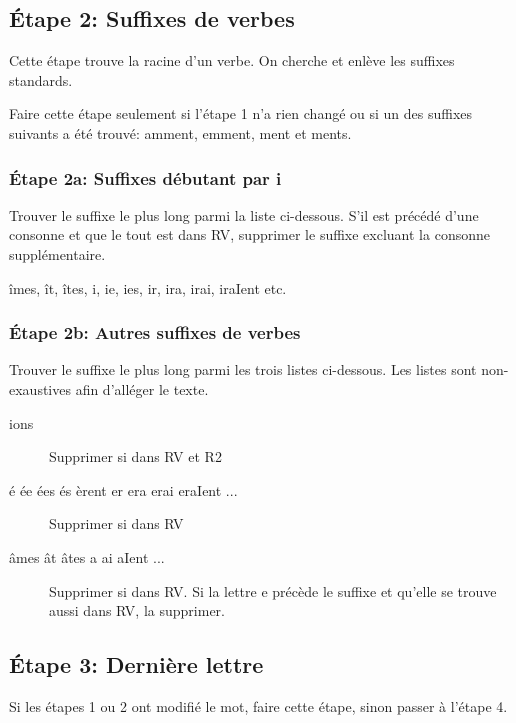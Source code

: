 \subsection*{Étape 2: Suffixes de verbes}

Cette étape trouve la racine d'un verbe.
On cherche et enlève les suffixes standards.

Faire cette étape seulement si l'étape 1 n'a rien changé ou si un des suffixes suivants a été trouvé: amment, emment, ment et ments.

\subsubsection*{Étape 2a: Suffixes débutant par i}

Trouver le suffixe le plus long parmi la liste ci-dessous.
S'il est précédé d'une consonne et que le tout est dans RV, supprimer le suffixe excluant la consonne supplémentaire.

îmes, ît, îtes, i, ie, ies, ir, ira, irai, iraIent etc.

\subsubsection*{Étape 2b: Autres suffixes de verbes}

Trouver le suffixe le plus long parmi les trois listes ci-dessous.
Les listes sont non-exaustives afin d'alléger le texte.

\begin{description}
  \item[ions]
  
  Supprimer si dans RV et R2
  
  \item[é ée ées és èrent er era erai eraIent ...]
  
  Supprimer si dans RV
  
  \item[âmes ât âtes a ai aIent ...]
  
  Supprimer si dans RV. Si la lettre e précède le suffixe et qu'elle se trouve aussi dans RV, la supprimer.
\end{description}

\subsection*{Étape 3: Dernière lettre}

Si les étapes 1 ou 2 ont modifié le mot, faire cette étape, sinon passer à l'étape 4.

